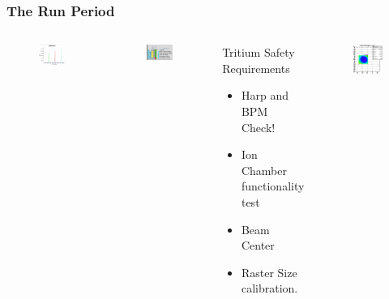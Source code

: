 \documentclass{beamer}
\begin{document}
\begin{frame}
\frametitle{The Run Period}
	\begin{columns}[t]
		\vspace{-10pt}

		\begin{figure}
			\includegraphics[width=4.5cm]{../images/harpscan1}
		\end{figure}

		\vspace{-10pt}
		\begin{figure}
			\includegraphics[width=4.5cm]{../images/ION}
		\end{figure}
		\vspace{-20pt}
		\begin{block}{Tritium Safety Requirements}
			\begin{itemize}
				\item Harp and BPM Check!
				\item Ion Chamber functionality test
				\item Beam Center
				\item Raster Size calibration. 
			\end{itemize}	
		\end{block}	
			\vspace{-10pt}
		\begin{figure}
			\includegraphics[width=5cm]{../images/spot}
		\end{figure}	
	\end{columns}
\end{frame}
\end{document}
